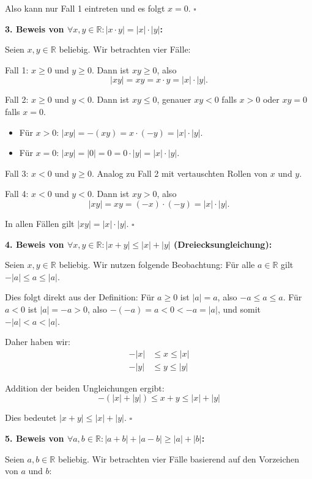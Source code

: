 \documentclass{article}
\newcommand{\abs}[1]{|#1|}
\newcommand{\R}{\mathbb{R}}
\newcommand{\fa}[1]{\forall #1 \colon}
\begin{document}
Also kann nur Fall 1 eintreten und es folgt $x = 0$. $\square$

\textbf{3. Beweis von \(\fa{x, y \in \R} \abs{x \cdot y} = \abs{x} \cdot \abs{y}\):}

Seien $x, y \in \R$ beliebig. Wir betrachten vier Fälle:

Fall 1: $x \geq 0$ und $y \geq 0$. Dann ist $xy \geq 0$, also
\[\abs{xy} = xy = x \cdot y = \abs{x} \cdot \abs{y}.\]

Fall 2: $x \geq 0$ und $y < 0$. Dann ist $xy \leq 0$, genauer $xy < 0$ falls $x > 0$ oder $xy = 0$ falls $x = 0$.
\begin{itemize}
\item Für $x > 0$: $\abs{xy} = -(xy) = x \cdot (-y) = \abs{x} \cdot \abs{y}$.
\item Für $x = 0$: $\abs{xy} = \abs{0} = 0 = 0 \cdot \abs{y} = \abs{x} \cdot \abs{y}$.
\end{itemize}

Fall 3: $x < 0$ und $y \geq 0$. Analog zu Fall 2 mit vertauschten Rollen von $x$ und $y$.

Fall 4: $x < 0$ und $y < 0$. Dann ist $xy > 0$, also
\[\abs{xy} = xy = (-x) \cdot (-y) = \abs{x} \cdot \abs{y}.\]

In allen Fällen gilt $\abs{xy} = \abs{x} \cdot \abs{y}$. $\square$

\textbf{4. Beweis von \(\fa{x, y \in \R} \abs{x + y} \leq \abs{x} + \abs{y}\) (Dreiecksungleichung):}

Seien $x, y \in \R$ beliebig. Wir nutzen folgende Beobachtung:
Für alle $a \in \R$ gilt $-\abs{a} \leq a \leq \abs{a}$.

Dies folgt direkt aus der Definition: Für $a \geq 0$ ist $\abs{a} = a$, also $-a \leq a \leq a$.
Für $a < 0$ ist $\abs{a} = -a > 0$, also $-(-a) = a < 0 < -a = \abs{a}$, und somit $-\abs{a} < a < \abs{a}$.

Daher haben wir:
\begin{align}
-\abs{x} &\leq x \leq \abs{x} \\
-\abs{y} &\leq y \leq \abs{y}
\end{align}

Addition der beiden Ungleichungen ergibt:
\[-(\abs{x} + \abs{y}) \leq x + y \leq \abs{x} + \abs{y}\]

Dies bedeutet $\abs{x + y} \leq \abs{x} + \abs{y}$. $\square$

\textbf{5. Beweis von \(\fa{a,b \in \R} \abs{a + b} + \abs{a - b} \geq \abs{a} + \abs{b}\):}

Seien $a, b \in \R$ beliebig. Wir betrachten vier Fälle basierend auf den Vorzeichen von $a$ und $b$:
\end{document}
